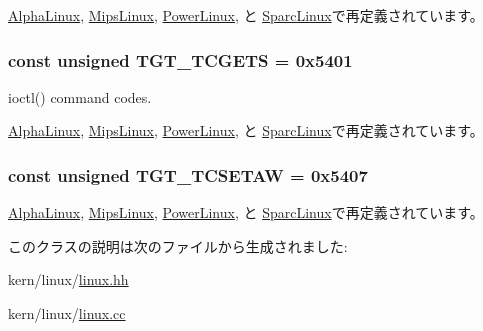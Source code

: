 \hyperlink{classAlphaLinux_a804fc265279c5dbd78e0f95da998b267}{AlphaLinux}, \hyperlink{classMipsLinux_a804fc265279c5dbd78e0f95da998b267}{MipsLinux}, \hyperlink{classPowerLinux_a804fc265279c5dbd78e0f95da998b267}{PowerLinux}, と \hyperlink{classSparcLinux_a804fc265279c5dbd78e0f95da998b267}{SparcLinux}で再定義されています。\hypertarget{classLinux_a50e5d880569ec2cb9a2f3d4aaa55cc64}{
\subsubsection[{TGT\_\-TCGETS}]{\setlength{\rightskip}{0pt plus 5cm}const unsigned {\bf TGT\_\-TCGETS} = 0x5401}}
\label{classLinux_a50e5d880569ec2cb9a2f3d4aaa55cc64}


ioctl() command codes. 

\hyperlink{classAlphaLinux_a50e5d880569ec2cb9a2f3d4aaa55cc64}{AlphaLinux}, \hyperlink{classMipsLinux_a50e5d880569ec2cb9a2f3d4aaa55cc64}{MipsLinux}, \hyperlink{classPowerLinux_a50e5d880569ec2cb9a2f3d4aaa55cc64}{PowerLinux}, と \hyperlink{classSparcLinux_a50e5d880569ec2cb9a2f3d4aaa55cc64}{SparcLinux}で再定義されています。\hypertarget{classLinux_a96e06e042526ea5e89c4e8a020636c52}{
\subsubsection[{TGT\_\-TCSETAW}]{\setlength{\rightskip}{0pt plus 5cm}const unsigned {\bf TGT\_\-TCSETAW} = 0x5407}}
\label{classLinux_a96e06e042526ea5e89c4e8a020636c52}


\hyperlink{classAlphaLinux_a96e06e042526ea5e89c4e8a020636c52}{AlphaLinux}, \hyperlink{classMipsLinux_a96e06e042526ea5e89c4e8a020636c52}{MipsLinux}, \hyperlink{classPowerLinux_a96e06e042526ea5e89c4e8a020636c52}{PowerLinux}, と \hyperlink{classSparcLinux_a96e06e042526ea5e89c4e8a020636c52}{SparcLinux}で再定義されています。

このクラスの説明は次のファイルから生成されました:\begin{DoxyCompactItemize}
\item 
kern/linux/\hyperlink{kern_2linux_2linux_8hh}{linux.hh}\item 
kern/linux/\hyperlink{kern_2linux_2linux_8cc}{linux.cc}\end{DoxyCompactItemize}

